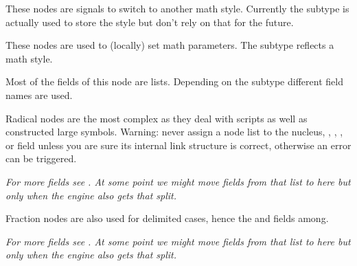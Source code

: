 These nodes are signals to switch to another math style. Currently the subtype is
actually used to store the style but don't rely on that for the future.



\stopsubsection

\startsubsection[title={parameter}]

These nodes are used to (locally) set math parameters. The subtype reflects a math style.



\stopsubsection

\startsubsection[title={choice}]

Most of the fields of this node are lists. Depending on the subtype different
field names are used.



\stopsubsection

\startsubsection[title={radical}]

Radical nodes are the most complex as they deal with scripts as well as
constructed large symbols. Warning: never assign a node list to the \type
{nucleus}, , , , or  field unless
you are sure its internal link structure is correct, otherwise an error can be
triggered.


{\em For more fields see . At some point we might move fields from
that list to here but only when the engine also gets that split.}


\stopsubsection

\startsubsection[title={fraction}]

Fraction nodes are also used for delimited cases, hence the  and
 fields among.


{\em For more fields see . At some point we might move fields from
that list to here but only when the engine also gets that split.}

